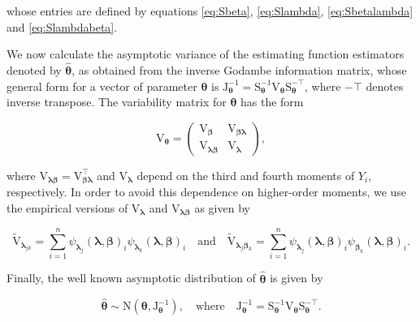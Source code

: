 \documentclass[9pt,a5paper,]{book}
\theoremstyle{definition}
\theoremstyle{definition}
\theoremstyle{remark}
\begin{document}
whose entries are defined by equations \eqref{eq:Sbeta}, \eqref{eq:Slambda},
\eqref{eq:Sbetalambda} and \eqref{eq:Slambdabeta}.

We now calculate the asymptotic variance of the estimating function
estimators denoted by \(\boldsymbol{\hat{\theta}}\), as obtained from
the inverse Godambe information matrix, whose general form for a vector
of parameter \(\boldsymbol{\theta}\) is
\(\mathrm{J}^{-1}_{\boldsymbol{\theta}} = \mathrm{S}^{-1}_{\boldsymbol{\theta}} \mathrm{V}_{\boldsymbol{\theta}} \mathrm{S}^{-\top}_{\boldsymbol{\theta}}\),
where \(-\top\) denotes inverse transpose. The variability matrix for
\(\boldsymbol{\theta}\) has the form

\begin{equation}
\mathrm{V}_{\boldsymbol{\theta}} = \begin{pmatrix}
\mathrm{V}_{\boldsymbol{\beta}} & \mathrm{V}_{\boldsymbol{\beta}\boldsymbol{\lambda}} \\
\mathrm{V}_{\boldsymbol{\lambda}\boldsymbol{\beta}} & \mathrm{V}_{\boldsymbol{\lambda}}
\end{pmatrix},
\label{eq:VTHETA}
\end{equation}

where
\(\mathrm{V}_{\boldsymbol{\lambda}\boldsymbol{\beta}} = \mathrm{V}^{\top}_{\boldsymbol{\beta}\boldsymbol{\lambda}}\)
and \(\mathrm{V}_{\boldsymbol{\lambda}}\) depend on the third and fourth
moments of \(Y_i\), respectively. In order to avoid this dependence on
higher-order moments, we use the empirical versions of
\(\mathrm{V}_{\boldsymbol{\lambda}}\) and
\(\mathrm{V}_{\boldsymbol{\lambda}\boldsymbol{\beta}}\) as given by

\begin{equation*}
\tilde{\mathrm{V}}_{\boldsymbol{\lambda}_{jk}} = \sum_{i=1}^n \psi_{\boldsymbol{\lambda}_j}(\boldsymbol{\lambda}, \boldsymbol{\beta})_i\psi_{\boldsymbol{\lambda}_k}(\boldsymbol{\lambda}, \boldsymbol{\beta})_i \quad \text{and} \quad \tilde{\mathrm{V}}_{\boldsymbol{\lambda}_j \boldsymbol{\beta}_k} = \sum_{i=1}^n \psi_{\boldsymbol{\lambda}_j}(\boldsymbol{\lambda}, \boldsymbol{\beta})_i \psi_{\boldsymbol{\beta}_k}(\boldsymbol{\lambda}, \boldsymbol{\beta})_i.
\end{equation*}

Finally, the well known asymptotic distribution of
\(\boldsymbol{\hat{\theta}}\) \citep{Jorgensen2004} is given by

\begin{equation*}
\boldsymbol{\hat{\theta}} \sim \mathrm{N}(\boldsymbol{\theta}, \mathrm{J}_{\boldsymbol{\theta}}^{-1}), \quad \text{where} \quad
\mathrm{J}^{-1}_{\boldsymbol{\theta}} = \mathrm{S}^{-1}_{\boldsymbol{\theta}} \mathrm{V}_{\boldsymbol{\theta}} \mathrm{S}^{-\top}_{\boldsymbol{\theta}}.
\end{equation*}
\end{document}
